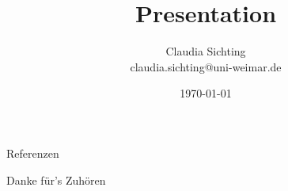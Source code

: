 \documentclass{beamer}%
\title{Presentation}
\author{Claudia Sichting\\\tiny{claudia.sichting@uni-weimar.de}}
\institute[]{Bauhaus-Universiät Weimar}
\date{\today}
\begin{document}

\frame{
	\titlepage
}


\begin{frame}{Referenzen}
\begin{tiny}

\end{tiny}

\begin{center}\LARGE{Danke für's Zuhören}\end{center}

\end{frame}

\end{document}
